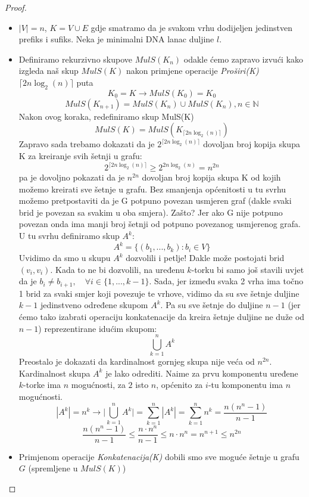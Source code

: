 \documentclass[a4paper,oneside,12pt]{memoir} %
\begin{document}
\begin{spacing}{1.5}
\begin{proof}
    \begin{itemize}
        \item $|V|=n$, $K=V\cup E$ gdje smatramo da je svakom vrhu dodijeljen jedinstven prefiks i sufiks. Neka je minimalni DNA lanac duljine $l$.
        \item Definiramo rekurzivno skupove $MulS(K_n)$ odakle ćemo zapravo izvući kako izgleda naš skup $MulS(K)$ nakon primjene operacije \textit{Proširi(K)} $\lceil 2n\log_2(n) \rceil$ puta
        \[K_0=K \to MulS(K_0)=K_0\]
        \[MulS(K_{n+1})=MulS(K_n) \cup MulS(K_n) , n \in \mathbb{N}\]
        Nakon ovog koraka, redefiniramo skup MulS(K)
        \[MulS(K)=MulS(K_{\lceil 2n\log_2(n) \rceil})\]
        Zapravo sada trebamo dokazati da je $2^{\lceil 2n\log_2(n) \rceil}$ dovoljan broj kopija skupa K za kreiranje svih šetnji u grafu:
        \[2^{\lceil 2n\log_2(n) \rceil} \geq 2^{ 2n\log_2(n) } = n^{2n}\]
        pa je dovoljno pokazati da je $n^{2n}$ dovoljan broj kopija skupa K od kojih možemo kreirati sve šetnje u grafu. Bez smanjenja općenitosti u tu svrhu možemo pretpostaviti da je G potpuno povezan usmjeren graf (dakle svaki brid je povezan sa svakim u oba smjera). Zašto? Jer ako G nije potpuno povezan onda ima manji broj šetnji od potpuno povezanog usmjerenog grafa. \\
        \noindent U tu svrhu definiramo skup $A^k$:
        \[A^k=\{(b_1,...,b_k): b_i \in V\}\]
        Uvidimo da smo u skupu $A^k$ dozvolili i petlje! Dakle može postojati brid $(v_i, v_i)$. Kada to ne bi dozvolili, na uređenu $k$-torku bi samo još stavili uvjet da je $b_i \neq b_{i+1}, \quad \forall i \in \{1,...,k-1\}$.
        Sada, jer između svaka 2 vrha ima točno 1 brid za svaki smjer koji povezuje te vrhove, vidimo da su sve šetnje duljine $k-1$ jedinstveno određene skupom $A^k$. Pa su sve šetnje do duljine $n-1$ (jer ćemo tako izabrati operaciju konkatenacije da kreira šetnje duljine ne duže od $n-1$) reprezentirane idućim skupom:
        \[\bigcup_{k=1}^n A^k\]
        Preostalo je dokazati da kardinalnost gornjeg skupa nije veća od $n^{2n}$. Kardinalnost skupa $A^k$ je lako odrediti. Naime za prvu komponentu uređene $k$-torke ima $n$ mogućnosti, za $2$ isto $n$, općenito za $i$-tu komponentu ima $n$ mogućnosti.
        \[|A^k|=n^k \to \bigg|\bigcup_{k=1}^n A^k\bigg|=\sum_{k=1}^n |A^k|=\sum_{k=1}^n n^k=\frac{n(n^n-1)}{n-1}\]
        \[\frac{n(n^n-1)}{n-1} \leq \frac{n\cdot n^n}{n-1} \leq n\cdot n^n =n^{n+1} \leq n^{2n}\]
        \item Primjenom operacije \textit{Konkatenacija(K)} dobili smo sve moguće šetnje u grafu $G$ (spremljene u $MulS(K)$)

\end{itemize}
\end{proof}
\end{spacing}
\end{document}
